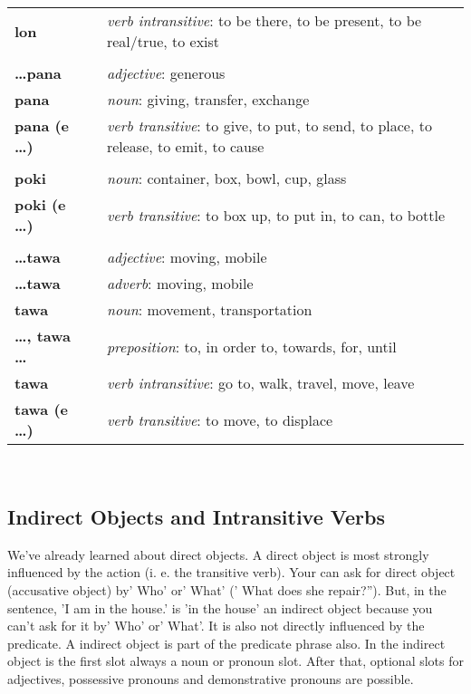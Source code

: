 \begin{supertabular}{p{2,5cm}|ll}
\textbf{lon} && \textit{verb intransitive}: to be there, to be present, to be real/true, to exist \\ %
 && \\ %
\textbf{\dots pana} && \textit{adjective}: generous \\ %
\textbf{pana} && \textit{noun}: giving, transfer, exchange \\ %
\textbf{pana (e \dots)} && \textit{verb transitive}: to give, to put, to send, to place, to release, to emit, to cause \\ %
 && \\ %
\textbf{poki} && \textit{noun}: container, box, bowl, cup, glass \\ %
\textbf{poki (e \dots)} && \textit{verb transitive}: to box up, to put in, to can, to bottle \\ %
 && \\ %
\textbf{\dots tawa} && \textit{adjective}: moving, mobile \\ %
\textbf{\dots tawa} && \textit{adverb}: moving, mobile \\ %
\textbf{tawa} && \textit{noun}: movement, transportation \\ %
\textbf{\dots , tawa \dots} && \textit{preposition}: to, in order to, towards, for, until \\ %
\textbf{tawa} && \textit{verb intransitive}: go to, walk, travel, move, leave \\ %
\textbf{tawa (e \dots)} && \textit{verb transitive}: to move, to displace \\ %
\end{supertabular} \\
%
\newpage
\subsection*{Indirect Objects and Intransitive Verbs}
%
We've already learned about direct objects. 
A direct object is most strongly influenced by the action (i. e. the transitive verb). 
Your can ask for direct object (accusative object) by' Who' or' What' (' What does she repair?'').
But, in the sentence, 'I am in the house.' is 'in the house' an indirect object because you can't ask for it by' Who' or' What'.
It is also not directly influenced by the predicate. 
A indirect object is part of the predicate phrase also. 
In the indirect object is the first slot always a noun or pronoun slot.
After that, optional slots for adjectives, possessive pronouns and demonstrative pronouns are possible. 

